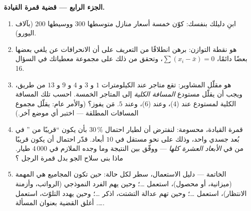 \begin{problem}
\medskip
\noindent\textbf{الجزء الرابع --- قضية قمرة القيادة.}
\begin{enumerate}[resume]
  \item ابنِ دليلك بنفسك: كوّن خمسة أسعار منازل
        متوسطها $300$ ووسيطها $200$ (بآلاف اليورو).
  \item {} هو نقطة التوازن: برهن انطلاقًا من التعريف
        على أن الانحرافات عن  يلغي بعضها بعضًا دائمًا،
        $\sum (x_i - \bar x) = 0$، وتحقق من ذلك على مجموعة معطياتك
        في السؤال 16.
  \item {} هو مقلّل المشاوير: تقع متاجر عند
        الكيلومترات $1$ و $3$ و $4$ و $9$ و $13$ من طريق، ويجب أن
        يقلّل مستودع \emph{المسافة الكلية} إلى
        المتاجر الخمسة. احسب تلك المسافة الكلية لمستودع عند
         ($4$)، وعند  ($6$)، وعند $5$. مَن يفوز؟
        (والأمر عام:  يقلّل مجموع المسافات المطلقة ---
        اختبر أي موضع آخر.)
  \item قمرة القيادة، محسومة: لنفترض أن لطيار احتمال $30\,\%$
        بأن يكون ``قريبًا من '' في بُعد جسدي
        واحد، وذلك على نحو مستقل في $10$ أبعاد.
        قدّر احتمال أن يكون قريبًا من  في
        \emph{الأبعاد العشرة كلها} --- ووفّق بين النتيجة وما
        وجده الملازم في $4\,000$ طيار. ماذا بنى سلاح
        الجو بدل قمرة الرجل ؟
  \item الخاتمة --- دليل الاستعمال، سطر لكل حالة: حين تكون المجاميع
        هي المهمة (ميزانية، أو محصول)، استعمل \dots؛
        وحين يهم الفرد النموذجي (الرواتب، وأزمنة
        الانتظار)، استعمل \dots؛ وحين تهم عدالة التشتت،
        اذكر \dots؛ وحين يهدد التلوّث، استعمل
        \dots. أغلق القضية بعنوان المسألة.
\end{enumerate}
\end{problem}
